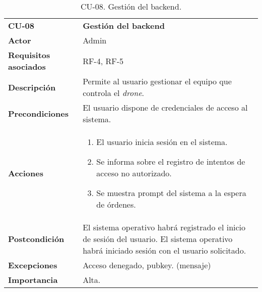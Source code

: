 \begin{table}[H]
	\begin{center}
		\begin{tabular}{m{3cm} | m{10cm}}\hline
			\toprule
			\textbf{CU-08} & \textbf{Gestión del backend}\\
			\otoprule
			\textbf{Actor} & Admin\\
			\textbf{Requisitos asociados} & RF-4, RF-5\\
			\textbf{Descripción} & Permite al usuario gestionar el equipo que controla el \emph{drone}.\\
			\textbf{Precondiciones} & El usuario dispone de credenciales de acceso al sistema.\\
			\textbf{Acciones} & \begin{enumerate}
											\item El usuario inicia sesión en el sistema.
											\item Se informa sobre el registro de intentos de acceso no autorizado.
											\item Se muestra prompt del sistema a la espera de órdenes.
											\end{enumerate}\\
			
			\textbf{Postcondición} & El sistema operativo habrá registrado el inicio de sesión del usuario. El sistema operativo habrá iniciado sesión con el usuario solicitado.\\
			\textbf{Excepciones} & Acceso denegado, pubkey. (mensaje)\\
			\textbf{Importancia} & Alta.\\
			\hline
			\bottomrule
		\end{tabular}
		\caption{CU-08. Gestión del backend.}
		\label{tb:CU08}
	\end{center}
\end{table}


